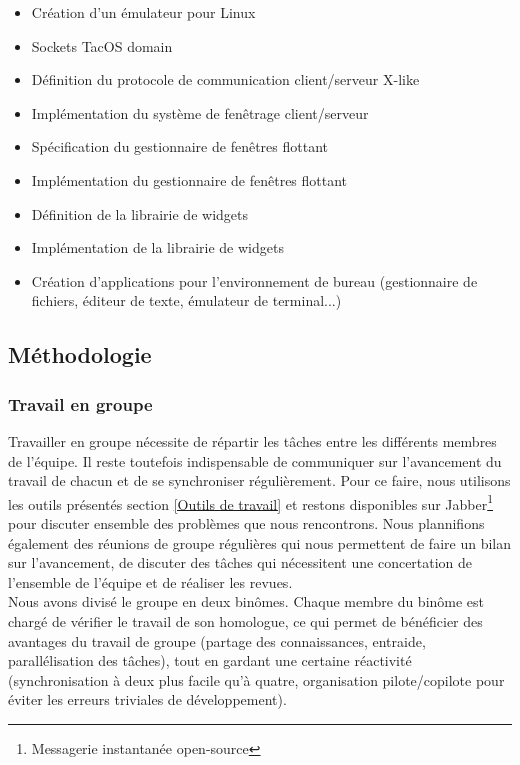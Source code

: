 \begin{itemize}
\renewcommand{\labelitemi}{$\bullet$}
\item {} Création d'un émulateur pour Linux
\item {} Sockets TacOS domain
\item {} Définition du protocole de communication client/serveur X-like
\item {} Implémentation du système de fenêtrage client/serveur
\item {} Spécification du gestionnaire de fenêtres flottant
\item {} Implémentation du gestionnaire de fenêtres flottant
\item {} Définition de la librairie de widgets
\item {} Implémentation de la librairie de widgets
\item {} Création d'applications pour l'environnement de bureau (gestionnaire de fichiers, éditeur de texte, émulateur de terminal...)
\end{itemize}

\subsection{Méthodologie}
\subsubsection{Travail en groupe}

Travailler en groupe nécessite de répartir les tâches entre les différents membres de l'équipe. Il reste toutefois indispensable de communiquer sur l'avancement du travail de chacun et de se synchroniser régulièrement. Pour ce faire, nous utilisons les outils présentés section \ref{Outils de travail} et restons disponibles sur Jabber\footnote{Messagerie instantanée open-source} pour discuter ensemble des problèmes que nous rencontrons. Nous plannifions également des réunions de groupe régulières qui nous permettent de faire un bilan sur l'avancement, de discuter des tâches qui nécessitent une concertation de l'ensemble de l'équipe et de réaliser les revues.\\

Nous avons divisé le groupe en deux binômes. Chaque membre du binôme est chargé de vérifier le travail de son homologue, ce qui permet de bénéficier des avantages du travail de groupe (partage des connaissances, entraide, parallélisation des tâches), tout en gardant une certaine réactivité (synchronisation à deux plus facile qu'à quatre, organisation pilote/copilote pour éviter les erreurs triviales de développement).

